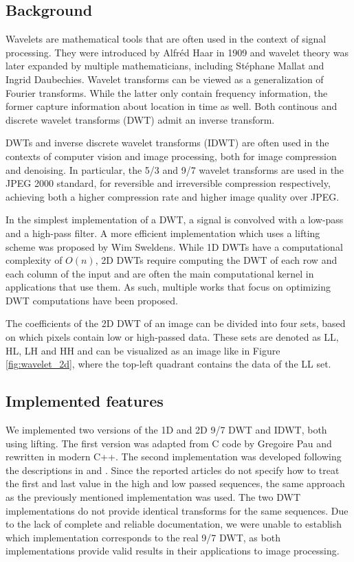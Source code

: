 \subsection{Background}
Wavelets are mathematical tools that are often used in the context of signal processing. They were introduced by Alfréd Haar in 1909\cite{haar} and wavelet theory was later expanded by multiple mathematicians, including Stéphane Mallat and Ingrid Daubechies. Wavelet transforms can be viewed as a generalization of Fourier transforms. While the latter only contain frequency information, the former capture information about location in time as well. Both continous and discrete wavelet transforms (DWT) admit an inverse transform.

DWTs and inverse discrete wavelet transforms (IDWT) are often used in the contexts of computer vision\cite{wavelet_application_4} and image processing\cite{wavelet_application_1}\cite{wavelet_application_2}, both for image compression and denoising\cite{wavelet_application_3}. In particular, the 5/3 and 9/7 wavelet transforms are used in the JPEG 2000 standard, for reversible and irreversible compression respectively, achieving both a higher compression rate and higher image quality over JPEG.

In the simplest implementation of a DWT, a signal is convolved with a low-pass and a high-pass filter. A more efficient implementation which uses a lifting scheme was proposed by Wim Sweldens\cite{lifting}. While 1D DWTs have a computational complexity of $O(n)$, 2D DWTs require computing the DWT of each row and each column of the input and are often the main computational kernel in applications that use them. As such, multiple works that focus on optimizing DWT computations have been proposed\cite{wavelet_fast_1}\cite{wavelet_fast_2}\cite{wavelet_fast_3}\cite{wavelet_fast_4}.

The coefficients of the 2D DWT of an image can be divided into four sets, based on which pixels contain low or high-passed data. These sets are denoted as LL, HL, LH and HH and can be visualized as an image like in Figure \ref{fig:wavelet_2d}, where the top-left quadrant contains the data of the LL set.

\subsection{Implemented features}
We implemented two versions of the 1D and 2D 9/7 DWT and IDWT, both using lifting. The first version was adapted from C code by Gregoire Pau\cite{gregoire_pau} and rewritten in modern C++. The second implementation was developed following the descriptions in \cite{Daubechies} and \cite{wavelet_fast_1}. Since the reported articles do not specify how to treat the first and last value in the high and low passed sequences, the same approach as the previously mentioned implementation was used. The two DWT implementations do not provide identical transforms for the same sequences. Due to the lack of complete and reliable documentation, we were unable to establish which implementation corresponds to the real 9/7 DWT, as both implementations provide valid results in their applications to image processing.

